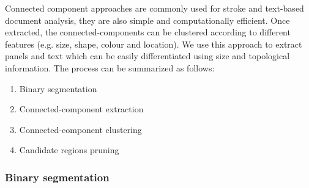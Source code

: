 Connected component approaches are commonly used for stroke and text-based document analysis, they are also simple and computationally efficient.
Once extracted, the connected-components can be clustered according to different features (e.g. size, shape, colour and location).
We use this approach to extract panels and text which can be easily differentiated using size and topological information.
The process can be summarized as follows:
  \begin{enumerate}
	\item Binary segmentation
	\item Connected-component extraction
	\item Connected-component clustering
	\item Candidate regions pruning
  \end{enumerate}


\subsubsection{Binary segmentation} %
\label{par:se:image_segmentation}


